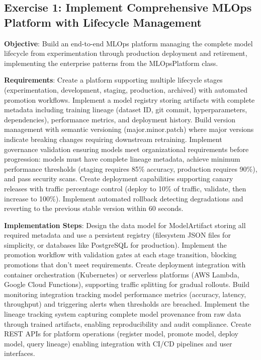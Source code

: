 \subsection{Exercise 1: Implement Comprehensive MLOps Platform with Lifecycle Management}

\textbf{Objective}: Build an end-to-end MLOps platform managing the complete model lifecycle from experimentation through production deployment and retirement, implementing the enterprise patterns from the MLOpsPlatform class.

\textbf{Requirements}: Create a platform supporting multiple lifecycle stages (experimentation, development, staging, production, archived) with automated promotion workflows. Implement a model registry storing artifacts with complete metadata including training lineage (dataset ID, git commit, hyperparameters, dependencies), performance metrics, and deployment history. Build version management with semantic versioning (major.minor.patch) where major versions indicate breaking changes requiring downstream retraining. Implement governance validation ensuring models meet organizational requirements before progression: models must have complete lineage metadata, achieve minimum performance thresholds (staging requires 85\% accuracy, production requires 90\%), and pass security scans. Create deployment capabilities supporting canary releases with traffic percentage control (deploy to 10\% of traffic, validate, then increase to 100\%). Implement automated rollback detecting degradations and reverting to the previous stable version within 60 seconds.

\textbf{Implementation Steps}: Design the data model for ModelArtifact storing all required metadata and use a persistent registry (filesystem JSON files for simplicity, or databases like PostgreSQL for production). Implement the promotion workflow with validation gates at each stage transition, blocking promotions that don't meet requirements. Create deployment integration with container orchestration (Kubernetes) or serverless platforms (AWS Lambda, Google Cloud Functions), supporting traffic splitting for gradual rollouts. Build monitoring integration tracking model performance metrics (accuracy, latency, throughput) and triggering alerts when thresholds are breached. Implement the lineage tracking system capturing complete model provenance from raw data through trained artifacts, enabling reproducibility and audit compliance. Create REST APIs for platform operations (register model, promote model, deploy model, query lineage) enabling integration with CI/CD pipelines and user interfaces.

